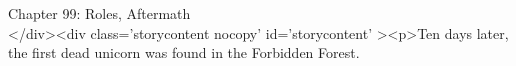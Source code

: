 
Chapter 99: Roles, Aftermath\\
</div><div  class='storycontent nocopy' id='storycontent' ><p>Ten days later, the first dead unicorn was found in the Forbidden Forest.